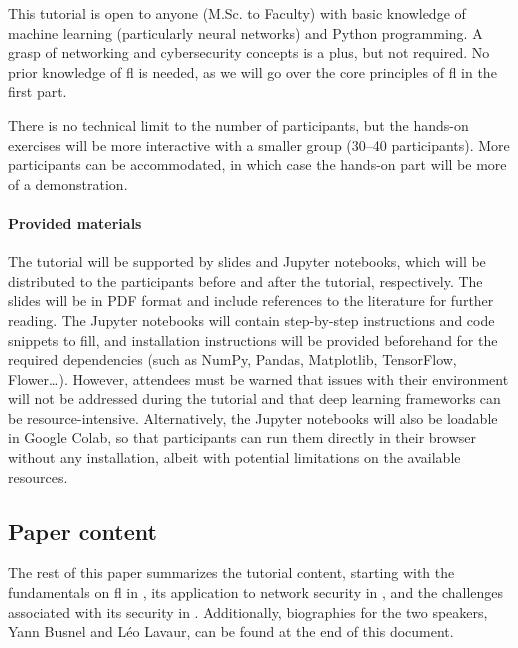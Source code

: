 \documentclass[conference]{IEEEtran}
\begin{document}
This tutorial is open to anyone (M.Sc.
to Faculty) with basic knowledge of machine learning (particularly neural networks) and Python programming.
A grasp of networking and cybersecurity concepts is a plus, but not required.
No prior knowledge of \gls{fl} is needed, as we will go over the core principles of \gls{fl} in the first part.

There is no technical limit to the number of participants, but the hands-on exercises will be more interactive with a smaller group (30--40 participants).
More participants can be accommodated, in which case the hands-on part will be more of a demonstration.

\paragraph*{Provided materials}

The tutorial will be supported by slides and Jupyter notebooks, which will be distributed to the participants before and after the tutorial, respectively.
The slides will be in PDF format and include references to the literature for further reading.
The Jupyter notebooks will contain step-by-step instructions and code snippets to fill, and installation instructions will be provided beforehand for the required dependencies (such as NumPy, Pandas, Matplotlib, TensorFlow, Flower\dots).
However, attendees must be warned that issues with their environment will not be addressed during the tutorial and that deep learning frameworks can be resource-intensive.
Alternatively, the Jupyter notebooks will also be loadable in Google Colab, so that participants can run them directly in their browser without any installation, albeit with potential limitations on the available resources.

\subsection{Paper content}

The rest of this paper summarizes the tutorial content, starting with the fundamentals on \gls{fl} in , its application to network security in , and the challenges associated with its security in .
Additionally, biographies for the two speakers, Yann Busnel and Léo Lavaur, can be found at the end of this document.
\end{document}
